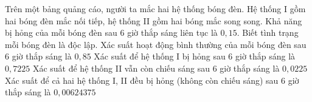 \begin{ex}%
	Trên một bảng quảng cáo, người ta mắc hai hệ thống bóng đèn. Hệ thống I gồm hai bóng đèn mắc nối tiếp, hệ thống II gồm hai bóng mắc song song. Khả năng bị hỏng của mỗi bóng đèn sau $6$ giờ thắp sáng liên tục là $0{,}15$. Biết tình trạng mỗi bóng đèn là độc lập.
	\choiceTF
	{\True Xác suất hoạt động bình thường của mỗi bóng đèn sau $6$ giờ thắp sáng là $0{,}85$}
	{Xác suất để hệ thống I bị hỏng sau $6$ giờ thắp sáng là $0{,}7225$}
	{Xác suất để hệ thống II vẫn còn chiếu sáng sau $6$ giờ thắp sáng là $0{,}0225$}
	{\True Xác suất để cả hai hệ thống I, II đều bị hỏng (không còn chiếu sáng) sau $6$ giờ thắp sáng là $0,00624375$}
\end{ex}
 

